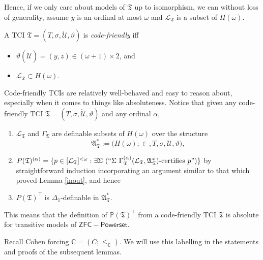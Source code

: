 \documentclass[12pt]{article}
\numberwithin{equation}{section}
\begin{document}
Hence, if we only care about models of $\mathfrak{T}$ up to isomorphism, we can without loss of generality, assume $y$ is an ordinal at most $\omega$ and $\mathcal{L}_{\mathfrak{T}}$ is a subset of $H(\omega)$.

\begin{defi}
A TCI $\mathfrak{T} = (T, \sigma, \dot{\mathcal{U}}, \vartheta)$ is \emph{code-friendly} iff 
\begin{itemize}
    \item $\vartheta(\dot{\mathcal{U}}) = (y, z) \in (\omega + 1) \times 2$, and 
    \item $\mathcal{L}_{\mathfrak{T}} \subset H(\omega)$.
\end{itemize}
\end{defi}

Code-friendly TCIs are relatively well-behaved and easy to reason about, especially when it comes to things like absoluteness. Notice that given any code-friendly TCI $\mathfrak{T} = (T, \sigma, \dot{\mathcal{U}}, \vartheta)$ and any ordinal $\alpha$,
\begin{enumerate}[leftmargin=40pt, label=(CF\arabic*)]
    \item\label{cf1} $\mathcal{L}_{\mathfrak{T}}$ and $\Gamma_{\mathfrak{T}}$ are definable subsets of $H(\omega)$ over the structure $$\mathfrak{A}^*_{\mathfrak{T}} := \mathfrak(H(\omega); \in, T, \sigma, \dot{\mathcal{U}}, \vartheta),$$
    \item $P(\mathfrak{T})^{(\alpha)} = \{p \in [\mathcal{L}_{\mathfrak{T}}]^{< \omega} : \exists \Sigma \ (``\Sigma \ \Gamma_{\mathfrak{T}}^{(\alpha)} (\mathcal{L}_{\mathfrak{T}}, \mathfrak{A}^*_{\mathfrak{T}})\text{-certifies } p")\}$ by straightforward induction incorporating an argument similar to that which proved Lemma \ref{inout}, and hence
    \item $P(\mathfrak{T})^{\top}$ is $\Delta_1$-definable in $\mathfrak{A}^*_{\mathfrak{T}}$.
\end{enumerate}
This means that the definition of $\mathbb{P}(\mathfrak{T})^{\top}$ from a code-friendly TCI $\mathfrak{T}$ is absolute for transitive models of $\mathsf{ZFC - Powerset}$.

Recall Cohen forcing $\mathbb{C} = (C; \leq_{\mathbb{C}})$. We will use this labelling in the statements and proofs of the subsequent lemmas.
\end{document}
